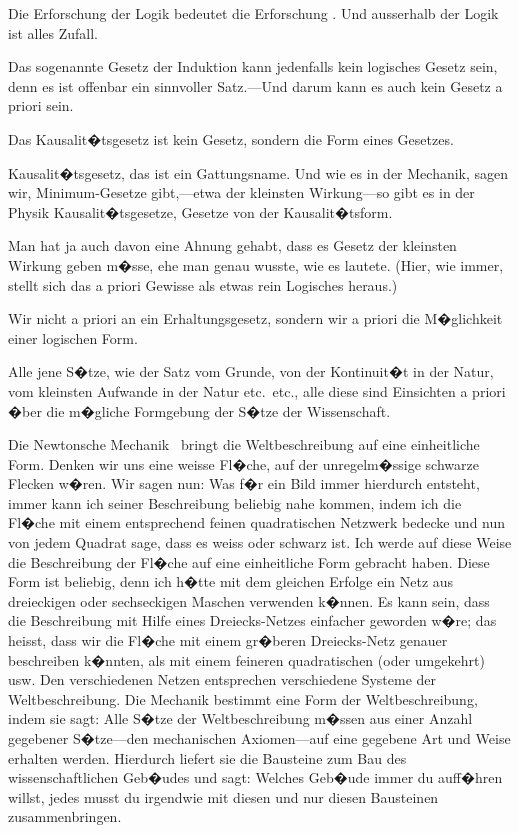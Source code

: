 \begin{propositions}
{Die Erforschung der Logik bedeutet die Erforschung
. Und ausserhalb
der Logik ist alles Zufall.}


{Das sogenannte Gesetz der Induktion kann
jedenfalls kein logisches Gesetz sein, denn es ist
offenbar ein sinnvoller Satz.---Und darum kann es
auch kein Gesetz a priori sein.}


{Das Kausalit�tsgesetz ist kein Gesetz, sondern
die Form eines Gesetzes.}


{\glqq{}Kausalit�tsgesetz\grqq{}, das ist ein Gattungsname.
Und wie es in der Mechanik, sagen wir, Minimum-Gesetze
gibt,---etwa der kleinsten Wir\-kung---so
gibt es in der Physik Kausalit�tsgesetze, Gesetze
von der Kausalit�tsform.}


{Man hat ja auch davon eine Ahnung gehabt, dass
es  \glqq{}Gesetz der kleinsten Wirkung\grqq{} geben m�sse,
ehe man genau wuss\-te, wie es lautete. (Hier, wie
immer, stellt sich das a priori Gewisse als etwas
rein Logisches heraus.)}


{Wir  nicht a priori an ein Erhaltungsgesetz,
sondern wir  a priori die
M�glichkeit einer logischen Form.}


{Alle jene S�tze, wie der Satz vom Grunde, von
der Kontinuit�t in der Natur, vom kleinsten Aufwande
in der Natur etc.\ etc., alle diese sind Einsichten
a priori �ber die m�gliche Formgebung der
S�tze der Wissenschaft.}


{Die Newtonsche Mechanik \zumBeispiel\ bringt die Weltbeschreibung
auf eine einheitliche Form. Denken
wir uns eine weisse Fl�che, auf der unregelm�ssige
schwarze Flecken w�ren. Wir sagen nun: Was f�r
ein Bild immer hierdurch entsteht, immer kann ich
seiner Beschreibung beliebig nahe kommen, indem
ich die Fl�che mit einem entsprechend feinen quadratischen
Netzwerk bedecke und nun von jedem
Quadrat sage, dass es weiss oder schwarz ist. Ich
werde auf diese Weise die Beschreibung der Fl�che
auf eine einheitliche Form gebracht haben. Diese
Form ist beliebig, denn ich h�tte mit dem gleichen
Erfolge ein Netz aus dreieckigen oder sechseckigen
Maschen verwenden k�nnen. Es kann sein, dass
die Beschreibung mit Hilfe eines Dreiecks-Netzes
einfacher geworden w�re; das heisst, dass wir die
Fl�che mit einem gr�beren Dreiecks-Netz genauer
beschreiben k�nnten, als mit einem feineren quadratischen
(oder umgekehrt) usw. Den verschiedenen
Netzen entsprechen verschiedene Systeme der
Weltbeschreibung. Die Mechanik bestimmt eine
Form der Weltbeschreibung, indem sie sagt:
Alle S�tze der Weltbeschreibung m�ssen aus einer
Anzahl gegebener S�tze---den mechanischen Axiomen---auf
eine gegebene Art und Weise erhalten
werden. Hierdurch liefert sie die Bausteine zum
Bau des wissenschaftlichen Geb�udes und sagt:
Welches Geb�ude immer du auff�hren willst, jedes
musst du irgendwie mit diesen und nur diesen
Bausteinen zusammenbringen.

}
\end{propositions}
